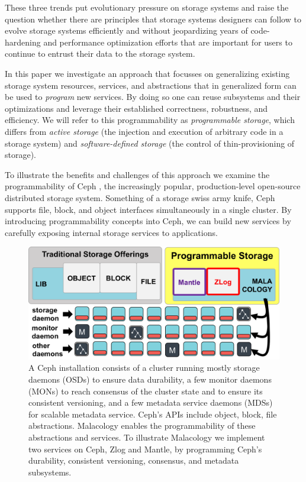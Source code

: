 \documentclass[10pt,twocolumn]{article}
\begin{document}
These three trends put evolutionary pressure on storage systems and
raise the question whether there are principles that storage systems
designers can follow to evolve storage systems efficiently and without
jeopardizing years of code-hardening and performance optimization
efforts that are important for users to continue to entrust their data
to the storage system.

In this paper we investigate an approach that focusses on generalizing
existing storage system resources, services, and abstractions that in
generalized form can be used to \emph{program} new services. By doing so
one can reuse subsystems and their optimizations and leverage their
established correctness, robustness, and efficiency. We will refer to
this programmability as \emph{programmable storage}, which differs from
\emph{active storage} (the injection and execution of arbitrary code in
a storage system) and \emph{software-defined storage} (the control of
thin-provisioning of storage).

To illustrate the benefits and challenges of this approach we examine
the programmability of Ceph \autocite{weil_ceph_2006}, the increasingly
popular, production-level open-source distributed storage system.
Something of a storage swiss army knife, Ceph supports file, block, and
object interfaces simultaneously in a single cluster. By introducing
programmability concepts into Ceph, we can build new services by
carefully exposing internal storage services to applications.

\begin{figure}[htbp]
\centering
\includegraphics{figures/overview.png}
\caption{A Ceph installation consists of a cluster running mostly
storage daemons (OSDs) to ensure data durability, a few monitor daemons
(MONs) to reach consensus of the cluster state and to ensure its
consistent versioning, and a few metadata service daemons (MDSs) for
scalable metadata service. Ceph's APIs include object, block, file
abstractions. Malacology enables the programmability of these
abstractions and services. To illustrate Malacology we implement two
services on Ceph, Zlog and Mantle, by programming Ceph's durability,
consistent versioning, consensus, and metadata subsystems.
\label{fig:overview}}
\end{figure}
\end{document}
